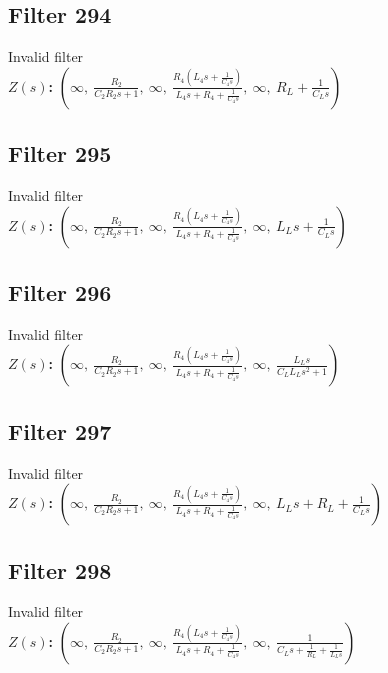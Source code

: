 \documentclass{article}
\begin{document}
\subsection*{Filter 294}
Invalid filter \\ 
\textbf{$Z(s)$:} $\left( \infty, \  \frac{R_{2}}{C_{2} R_{2} s + 1}, \  \infty, \  \frac{R_{4} \left(L_{4} s + \frac{1}{C_{4} s}\right)}{L_{4} s + R_{4} + \frac{1}{C_{4} s}}, \  \infty, \  R_{L} + \frac{1}{C_{L} s}\right)$ \\ 
\subsection*{Filter 295}
Invalid filter \\ 
\textbf{$Z(s)$:} $\left( \infty, \  \frac{R_{2}}{C_{2} R_{2} s + 1}, \  \infty, \  \frac{R_{4} \left(L_{4} s + \frac{1}{C_{4} s}\right)}{L_{4} s + R_{4} + \frac{1}{C_{4} s}}, \  \infty, \  L_{L} s + \frac{1}{C_{L} s}\right)$ \\ 
\subsection*{Filter 296}
Invalid filter \\ 
\textbf{$Z(s)$:} $\left( \infty, \  \frac{R_{2}}{C_{2} R_{2} s + 1}, \  \infty, \  \frac{R_{4} \left(L_{4} s + \frac{1}{C_{4} s}\right)}{L_{4} s + R_{4} + \frac{1}{C_{4} s}}, \  \infty, \  \frac{L_{L} s}{C_{L} L_{L} s^{2} + 1}\right)$ \\ 
\subsection*{Filter 297}
Invalid filter \\ 
\textbf{$Z(s)$:} $\left( \infty, \  \frac{R_{2}}{C_{2} R_{2} s + 1}, \  \infty, \  \frac{R_{4} \left(L_{4} s + \frac{1}{C_{4} s}\right)}{L_{4} s + R_{4} + \frac{1}{C_{4} s}}, \  \infty, \  L_{L} s + R_{L} + \frac{1}{C_{L} s}\right)$ \\ 
\subsection*{Filter 298}
Invalid filter \\ 
\textbf{$Z(s)$:} $\left( \infty, \  \frac{R_{2}}{C_{2} R_{2} s + 1}, \  \infty, \  \frac{R_{4} \left(L_{4} s + \frac{1}{C_{4} s}\right)}{L_{4} s + R_{4} + \frac{1}{C_{4} s}}, \  \infty, \  \frac{1}{C_{L} s + \frac{1}{R_{L}} + \frac{1}{L_{L} s}}\right)$ \\ 
\end{document}
